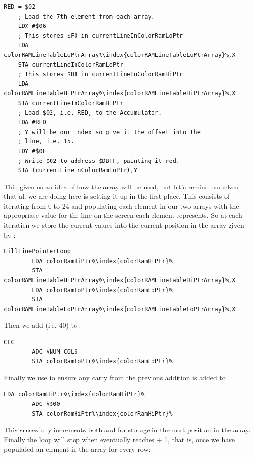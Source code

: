 \begin{lstlisting}[escapechar=\%]
    RED = $02
    ; Load the 7th element from each array.
    LDX #$06
    ; This stores $F0 in currentLineInColorRamLoPtr
    LDA colorRAMLineTableLoPtrArray%\index{colorRAMLineTableLoPtrArray}%,X
    STA currentLineInColorRamLoPtr
    ; This stores $D8 in currentLineInColorRamHiPtr
    LDA colorRAMLineTableHiPtrArray%\index{colorRAMLineTableHiPtrArray}%,X
    STA currentLineInColorRamHiPtr
    ; Load $02, i.e. RED, to the Accumulator. 
    LDA #RED
    ; Y will be our index so give it the offset into the
    ; line, i.e. 15. 
    LDY #$0F
    ; Write $02 to address $DBFF, painting it red.
    STA (currentLineInColorRamLoPtr),Y
\end{lstlisting}

This gives us an idea of how the array will be used, but let's remind ourselves that all we are doing here is setting
it up in the first place. This consists of iterating from 0 to 24 and populating each element in our two arrays with
the appropriate value for the line on the screen each element represents. So at each iteration we store
the current values into the current position in the array given by :

\begin{lstlisting}[escapechar=\%]
FillLinePointerLoop
        LDA colorRamHiPtr%\index{colorRamHiPtr}%
        STA colorRAMLineTableHiPtrArray%\index{colorRAMLineTableHiPtrArray}%,X
        LDA colorRamLoPtr%\index{colorRamLoPtr}%
        STA colorRAMLineTableLoPtrArray%\index{colorRAMLineTableLoPtrArray}%,X
\end{lstlisting}

Then we add   (i.e. 40) to : 

\begin{lstlisting}[escapechar=\%]
        CLC 
        ADC #NUM_COLS
        STA colorRamLoPtr%\index{colorRamLoPtr}%
\end{lstlisting}

Finally we use  to ensure any carry from the previous addition is added to . 

\begin{lstlisting}[escapechar=\%]
        LDA colorRamHiPtr%\index{colorRamHiPtr}%
        ADC #$00
        STA colorRamHiPtr%\index{colorRamHiPtr}%
\end{lstlisting}

This succesfully increments both  and  for storage in the next position in
the array. Finally the loop will stop when  eventually reaches  + 1, that is, once we have
populated an element in the array for every row:

